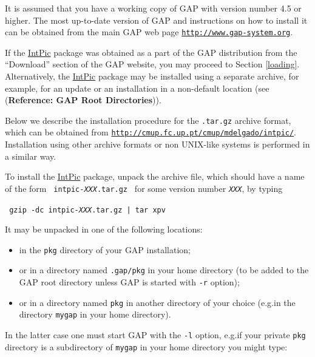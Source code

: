 \documentclass[a4paper,11pt]{report}
\begin{document}
{{ It is assumed that you have a working copy of \textsf{GAP} with version number 4.5 or higher. The most up-to-date version of \textsf{GAP} and instructions on how to install it can be obtained from the main \textsf{GAP} web page \noindent\vspace{\baselineskip} \href{http://www.gap-system.org} {\texttt{http://www.gap-system.org}}. 

 \noindent If the \href{http://www.fc.up.pt/cmup/mdelgado/intpic} {IntPic} package was obtained as a part of the \textsf{GAP} distribution from the ``Download'' section of the \textsf{GAP} website, you may proceed to Section \ref{loading}. Alternatively, the \href{http://www.fc.up.pt/cmup/mdelgado/intpic} {IntPic} package may be installed using a separate archive, for example, for an update
or an installation in a non-default location (see  (\textbf{Reference: GAP Root Directories})). 

 Below we describe the installation procedure for the \texttt{.tar.gz} archive format, which can be obtained from \href{http://cmup.fc.up.pt/cmup/mdelgado/intpic/} {\texttt{http://cmup.fc.up.pt/cmup/mdelgado/intpic/}}. Installation using other archive formats or non UNIX-like systems is
performed in a similar way. 

 To install the \href{http://www.fc.up.pt/cmup/mdelgado/intpic} {IntPic} package, unpack the archive file, which should have a name of the form \texttt{ intpic-\mbox{\texttt{\mdseries\slshape XXX}}.tar.gz } for some version number \mbox{\texttt{\mdseries\slshape XXX}}, by typing 

 {\nobreakspace}{\nobreakspace} \texttt{ gzip -dc intpic-\mbox{\texttt{\mdseries\slshape XXX}}.tar.gz | tar xpv } 

 It may be unpacked in one of the following locations: 
\begin{itemize}
\item  in the \texttt{pkg} directory of your \textsf{GAP} installation; 
\item  or in a directory named \texttt{.gap/pkg} in your home directory (to be added to the \textsf{GAP} root directory unless \textsf{GAP} is started with \texttt{-r} option); 
\item  or in a directory named \texttt{pkg} in another directory of your choice (e.g.{\nobreakspace}in the directory \texttt{mygap} in your home directory). 
\end{itemize}
 In the latter case one must start \textsf{GAP} with the \texttt{-l} option, e.g.{\nobreakspace}if your private \texttt{pkg} directory is a subdirectory of \texttt{mygap} in your home directory you might type: 

}}
\end{document}
